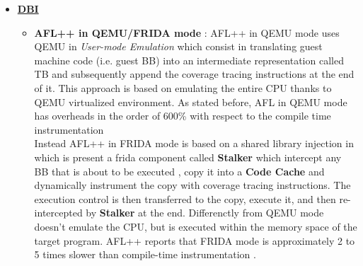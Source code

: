        \begin{itemize}
            \item \underline{\textbf{\gls{DBI}}}
            \begin{itemize}
                \item \textbf{AFL++ in QEMU/FRIDA mode}\cite{aflplusplus} : AFL++ in QEMU mode uses QEMU in \textit{User-mode Emulation}
                    which consist in translating guest machine code (i.e. guest \gls{BB}) into an intermediate representation 
                    called \gls{TB} and subsequently append the coverage tracing instructions at the end of it.
                    This approach is based on emulating the entire CPU thanks to QEMU virtualized environment. As stated before, 
                    AFL in QEMU mode has overheads in the order of 600\% with respect to the compile time instrumentation \cite{zafl}\\
                    Instead AFL++ in FRIDA mode \cite{aflplusplus-frida-mode} is based on a shared library injection in which is present a frida \cite{frida} component 
                    called \textbf{Stalker} which intercept any \gls{BB} that is about to be executed , copy it into a \textbf{Code Cache} 
                    and dynamically instrument the copy with coverage tracing instructions. 
                    The execution control is then transferred to the copy, execute it, and then re-intercepted by \textbf{Stalker} at the end.
                    Differenctly from QEMU mode doesn't emulate the CPU, but is executed within the memory space of the target program.
                    AFL++ reports that FRIDA mode is approximately 2 to 5 times slower than compile-time instrumentation \cite{aflplusplus_binary_only_targets}.
                

\end{itemize}
\end{itemize}
